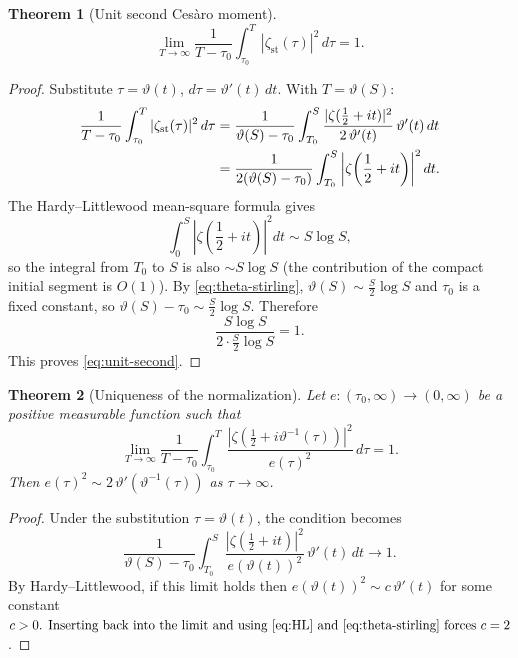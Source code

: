 \documentclass[11pt]{article}
\numberwithin{equation}{section}
\theoremstyle{plain}
\newtheorem{theorem}{Theorem}[section]
\theoremstyle{definition}
\begin{document}
\begin{theorem}[Unit second Ces\`aro moment]
\label{thm:second-moment}
\begin{equation}
\lim_{T\to\infty}
\frac{1}{T-\tau_0}
\int_{\tau_0}^T
|\zeta_{\mathrm{st}}(\tau)|^2\,d\tau
=
1.
\label{eq:unit-second}
\end{equation}
\end{theorem}

\begin{proof}
Substitute \(\tau=\vartheta(t)\), \(d\tau=\vartheta'(t)\,dt\). With \(T=\vartheta(S)\):
\begin{align}
\frac{1}{T-\tau_0}
\int_{\tau_0}^T |\zeta_{\mathrm{st}}(\tau)|^2\,d\tau
&=
\frac{1}{\vartheta(S)-\tau_0}
\int_{T_0}^S
\frac{|\zeta(\frac12+it)|^2}{2\,\vartheta'(t)}
\,\vartheta'(t)\,dt
\notag\\
&=
\frac{1}{2(\vartheta(S)-\tau_0)}
\int_{T_0}^S
\left|\zeta\!\left(\frac12+it\right)\right|^2dt.
\label{eq:mean-square-sub}
\end{align}
The Hardy--Littlewood mean-square formula gives
\begin{equation}
\int_0^S
\left|\zeta\!\left(\frac12+it\right)\right|^2dt
\sim S\log S,
\label{eq:HL}
\end{equation}
so the integral from \(T_0\) to \(S\) is also \(\sim S\log S\) (the contribution of
the compact initial segment is \(O(1)\)). By \eqref{eq:theta-stirling},
\(\vartheta(S)\sim \frac{S}{2}\log S\) and \(\tau_0\) is a fixed constant, so
\(\vartheta(S)-\tau_0\sim\frac{S}{2}\log S\). Therefore
\[
\frac{S\log S}{2\cdot\frac{S}{2}\log S}=1.
\]
This proves \eqref{eq:unit-second}.
\end{proof}

\begin{theorem}[Uniqueness of the normalization]
Let \(e:(\tau_0,\infty)\to(0,\infty)\) be a positive measurable function such that
\[
\lim_{T\to\infty}
\frac{1}{T-\tau_0}
\int_{\tau_0}^T
\frac{|\zeta(\frac12+i\vartheta^{-1}(\tau))|^2}{e(\tau)^2}\,d\tau
=
1.
\]
Then \(e(\tau)^2\sim 2\,\vartheta'(\vartheta^{-1}(\tau))\) as \(\tau\to\infty\).
\end{theorem}

\begin{proof}
Under the substitution \(\tau=\vartheta(t)\), the condition becomes
\[
\frac{1}{\vartheta(S)-\tau_0}
\int_{T_0}^S
\frac{|\zeta(\frac12+it)|^2}{e(\vartheta(t))^2}\,\vartheta'(t)\,dt
\to 1.
\]
By Hardy--Littlewood, if this limit holds then \(e(\vartheta(t))^2\sim c\,\vartheta'(t)\)
for some constant \(c>0$. Inserting back into the limit and using \eqref{eq:HL} and
\eqref{eq:theta-stirling} forces \(c=2\).
\end{proof}
\end{document}
